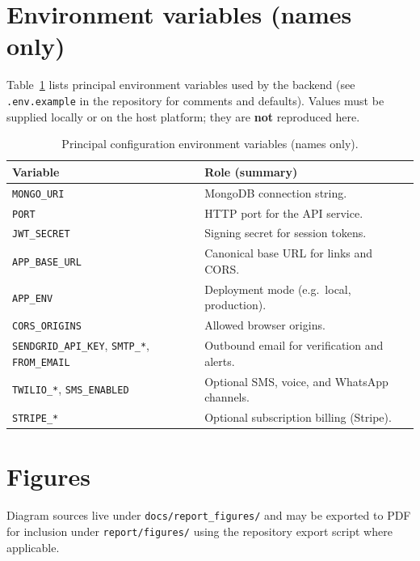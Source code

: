 \section{Environment variables (names only)}
Table~\ref{tab:envkeys} lists principal environment variables used by the backend (see \texttt{.env.example} in the repository for comments and defaults). Values must be supplied locally or on the host platform; they are \textbf{not} reproduced here.

\begin{table}[htbp]
  \centering
  \small
  \caption{Principal configuration environment variables (names only).}
  \label{tab:envkeys}
  \begin{tabular}{p{5.2cm}p{9.5cm}}
    \toprule
    \textbf{Variable} & \textbf{Role (summary)} \\
    \midrule
    \texttt{MONGO\_URI} & MongoDB connection string. \\
    \texttt{PORT} & HTTP port for the API service. \\
    \texttt{JWT\_SECRET} & Signing secret for session tokens. \\
    \texttt{APP\_BASE\_URL} & Canonical base URL for links and CORS. \\
    \texttt{APP\_ENV} & Deployment mode (e.g.\ local, production). \\
    \texttt{CORS\_ORIGINS} & Allowed browser origins. \\
    \texttt{SENDGRID\_API\_KEY}, \texttt{SMTP\_*}, \texttt{FROM\_EMAIL} & Outbound email for verification and alerts. \\
    \texttt{TWILIO\_*}, \texttt{SMS\_ENABLED} & Optional SMS, voice, and WhatsApp channels. \\
    \texttt{STRIPE\_*} & Optional subscription billing (Stripe). \\
    \bottomrule
  \end{tabular}
\end{table}

\section{Figures}
Diagram sources live under \texttt{docs/report\_figures/} and may be exported to PDF for inclusion under \texttt{report/figures/} using the repository export script where applicable.
